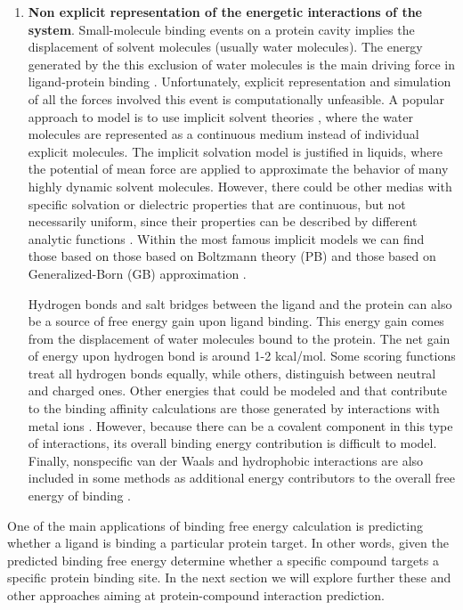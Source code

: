 \documentclass[12pt, a4paper,twoside]{tesi_upf}
\begin{document}
\begin{enumerate}
\item \textbf{Non explicit representation of the energetic interactions of the system}. Small-molecule binding events on a protein cavity implies the displacement of solvent molecules (usually water molecules). The energy generated by the this exclusion of water molecules is the main driving force in ligand-protein binding \cite{Michel2009a}. Unfortunately, explicit representation and simulation of all the forces involved this event is computationally unfeasible. A popular approach to model is to use implicit solvent theories \cite{Ravindranathan2011, Michel2006, Liu2009}, where the water molecules are represented as a continuous medium instead of individual explicit molecules. The implicit solvation model is justified in liquids, where the potential of mean force are applied to approximate the behavior of many highly dynamic solvent molecules. However, there could be other medias with specific solvation or dielectric properties that are continuous, but not necessarily uniform, since their properties can be described by different analytic functions \cite{Lu2007}. Within the most famous implicit models we can find those based on those based on Boltzmann theory (PB) \cite{Sharp1990} and those based on Generalized-Born (GB) approximation \cite{Bashford2000}. 
\par Hydrogen bonds and salt bridges between the ligand and the protein can also be a source of free energy gain upon ligand binding. This energy gain comes from the displacement of water molecules bound to the protein. The net gain of energy upon hydrogen bond is around 1-2 kcal/mol. Some scoring functions treat all hydrogen bonds equally, while others, distinguish between neutral and charged ones. Other energies that could be modeled and that contribute to the binding affinity calculations are those generated by interactions with metal ions \cite{Friesner2004}. However, because there can be a covalent component in this type of interactions, its overall binding energy contribution is difficult to model. Finally, nonspecific van der Waals and hydrophobic interactions are also included in some methods as additional energy contributors to the overall free energy of binding \cite{Steffen2010}. 
\end{enumerate}

\par One of the main applications of binding free energy calculation is predicting whether a ligand is binding a particular protein target. In other words, given the predicted binding free energy determine whether a specific compound targets a specific protein binding site. In the next section we will explore further these and other approaches aiming at protein-compound interaction prediction.  
\end{document}
